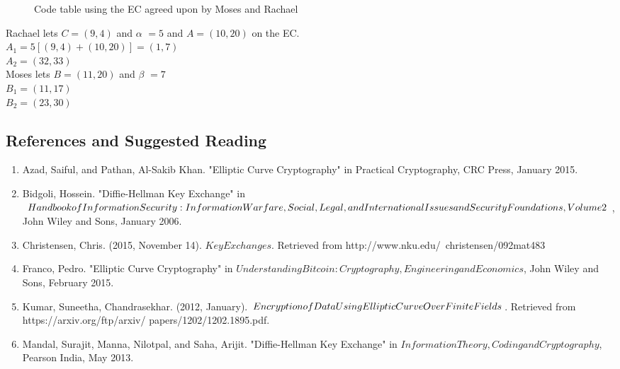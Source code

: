 \begin{figure}[H]
	  \caption{\label{fig:DH:DHKE_17} Code table using the EC agreed upon by Moses and Rachael }
\end{figure}
Rachael lets $C = (9,4)$ and $\alpha$ $= 5$ and $A = (10, 20)$ on the EC.\\
	$A_1 = 5[(9, 4) + (10, 20)] = (1, 7)$\\
	$A_2 = (32, 33)$\\
Moses lets $B = (11, 20)$ and $\beta$ $= 7$ \\
	$B_1 = (11, 17)$\\
	$B_2 = (23, 30)$
\newpage  

\subsection{References and Suggested Reading} 
\begin{enumerate}[(1)]

\item
Azad, Saiful, and Pathan, Al-Sakib Khan. "Elliptic Curve Cryptography" in Practical Cryptography, CRC Press, January 2015.

\item 
Bidgoli, Hossein. "Diffie-Hellman Key Exchange" in $Handbook of Information \newline
Security: Information Warfare, Social, Legal, and International Issues and \newline
Security Foundations, Volume 2$, John Wiley and Sons, January 2006.

\item 
Christensen, Chris. (2015, November 14). $Key Exchanges$. Retrieved from http://www.nku.edu/~christensen/092mat483%

\item
Franco, Pedro. "Elliptic Curve Cryptography" in $Understanding Bitcoin: Cryptography, Engineering and Economics$, John Wiley and Sons, February 2015.

\item 
Kumar, Suneetha, Chandrasekhar. (2012, January). $Encryption of Data  Using \newline
Elliptic Curve Over Finite Fields$. Retrieved from https://arxiv.org/ftp/arxiv/ \newline
papers/1202/1202.1895.pdf.

\item 
Mandal, Surajit, Manna, Nilotpal, and Saha, Arijit. "Diffie-Hellman Key Exchange" in $Information Theory, Coding and Cryptography$, Pearson India, May 2013.





\end{enumerate}